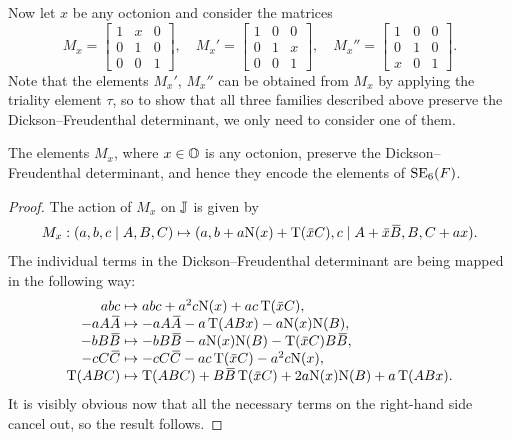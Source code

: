 Now let $x$ be any octonion and consider the matrices
\begin{equation}
	M_x = \begin{bmatrix}
		1 & x & 0 \\
		0 & 1 & 0 \\
		0 & 0 & 1 
	\end{bmatrix},\quad 
	M_x' = \begin{bmatrix}
		1 & 0 & 0 \\
		0 & 1 & x \\
		0 & 0 & 1
	\end{bmatrix},\quad 
	M_x'' = \begin{bmatrix}
		1 & 0 & 0 \\
		0 & 1 & 0 \\
		x & 0 & 1
	\end{bmatrix}.
\end{equation}
Note that the elements $M_x'$, $M_x''$ can be obtained from $M_x$ by applying 
the triality element $\tau$, so to show that all three families described above preserve
the Dickson--Freudenthal determinant, we only need to consider one of them. 

\begin{lemma}
	\label{lemma:Mx_det}
	The elements $M_x$, where $x \in \mathbb{O}$ is any octonion, preserve the Dickson--Freudenthal
	determinant, and hence they encode the elements of $\mathrm{SE}_6(F)$. 
\end{lemma} 

\begin{proof}
	The action of $M_x$ on $\mathbb{J}$ is given by
	\begin{equation*}
		\begin{array}{r@{\;}c@{\;}l}
		M_x: (a,b,c\mid A,B,C) & \mapsto & (a,b+a\NN(x)+\Tr(\ovx C),c \mid 
										A+\ovx\ovB, B, C+ax).
		\end{array}
	\end{equation*}
	The individual terms in the Dickson--Freudenthal determinant are being mapped in
	the following way:
	\begin{equation*}
		\begin{array}{r@{\;}c@{\;}l}
			abc & \mapsto & abc + a^2c\NN(x) + ac\Tr(\ovx C), \\
			-aA\ovA & \mapsto & -aA\ovA - a\Tr(ABx) - a\NN(x)\NN(B), \\
			-bB\ovB & \mapsto & -bB\ovB - a\NN(x)\NN(B) - \Tr(\ovx C)B\ovB, \\
			-cC\ovC & \mapsto & -cC\ovC - ac\Tr(\ovx C) - a^2c\NN(x), \\
			\Tr(ABC) & \mapsto & \Tr(ABC) + B\ovB\Tr(\ovx C) + 2a\NN(x)\NN(B) + a\Tr(ABx). 
		\end{array}
	\end{equation*}
	It is visibly obvious now that all the necessary terms on the right-hand side cancel out,
	so the result follows.
\end{proof}

